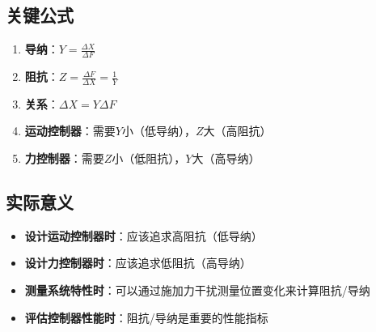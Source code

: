 \documentclass[12pt,a4paper]{article}
\begin{document}
\subsection{关键公式}

\begin{enumerate}
\item \textbf{导纳}：$Y = \frac{\Delta X}{\Delta F}$
\item \textbf{阻抗}：$Z = \frac{\Delta F}{\Delta X} = \frac{1}{Y}$
\item \textbf{关系}：$\Delta X = Y \Delta F$
\item \textbf{运动控制器}：需要$Y$小（低导纳），$Z$大（高阻抗）
\item \textbf{力控制器}：需要$Z$小（低阻抗），$Y$大（高导纳）
\end{enumerate}

\subsection{实际意义}

\begin{itemize}
\item \textbf{设计运动控制器时}：应该追求高阻抗（低导纳）
\item \textbf{设计力控制器时}：应该追求低阻抗（高导纳）
\item \textbf{测量系统特性时}：可以通过施加力干扰测量位置变化来计算阻抗/导纳
\item \textbf{评估控制器性能时}：阻抗/导纳是重要的性能指标
\end{itemize}
\end{document}
